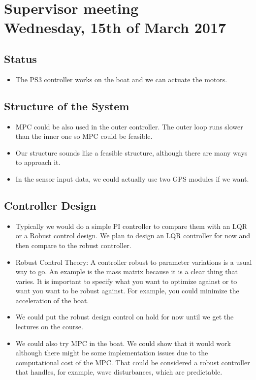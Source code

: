 
\renewcommand{\vec}[1]{\boldsymbol{\mathbf{#1}}}

\renewcommand\chaptername{KAPITEL}
\renewcommand\contentsname{Indhold}
\renewcommand\figurename{Figur}
\renewcommand\tablename{Tabel}

\section*{Supervisor meeting\\ \small Wednesday, 15th of March 2017}
\subsection{Status}
\begin{itemize}
	\item The PS3 controller works on the boat and we can actuate the motors. 
\end{itemize}	
\subsection{Structure of the System}
\begin{itemize}
	\item MPC could be also used in the outer controller. The outer loop runs slower than the inner one so MPC could be feasible. 
	\item Our structure sounds like a feasible structure, although there are many ways to approach it.
	\item In the sensor input data, we could actually use two GPS modules if we want.
\end{itemize}	
\subsection{Controller Design}
\begin{itemize}
	\item Typically we would do a simple PI controller to compare them with an LQR or a Robust control design. We plan to design an LQR controller for now and then compare to the robust controller.
	\item Robust Control Theory: A controller robust to parameter variations is a usual way to go. An example is the mass matrix because it is a clear thing that varies. It is important to specify what you want to optimize against or to want you want to be robust against. For example, you could minimize the acceleration of the boat. 
	\item We could put the robust design control on hold for now until we get the lectures on the course.
	\item We could also try MPC in the boat. We could show that it would work although there might be some implementation issues due to the computational cost of the MPC. That could be considered a robust controller that handles, for example, wave disturbances, which are predictable.
\end{itemize}
